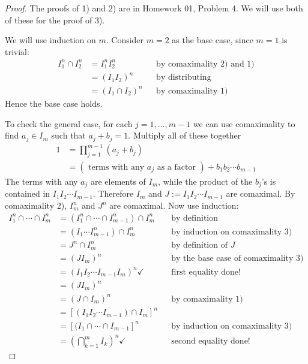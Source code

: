 \documentclass[12pt]{article}
\theoremstyle{definition}
\begin{document}
\begin{proof}
    The proofs of 1) and 2) are in Homework 01, Problem 4. We will use both of these for the proof of 3).
    
    We will use induction on $m$. Consider $m=2$ as the base case, since $m=1$ is trivial:
    \begin{align*}
        I_1^n\cap I_2^n&=I_1^nI_2^n&&\text{by comaximality 2) and 1)}\\
        &=(I_1I_2)^n&&\text{by distributing }\\
        &=(I_1\cap I_2)^n&&\text{by comaximality 1)}
    \end{align*}
    Hence the base case holds. \checkmark
    
    To check the general case, for each $j=1,\dotsc,m-1$ we can use comaximality to find $a_j\in I_m$ such that $a_j+b_j=1$. Multiply all of these together
    \begin{equation*}
        \begin{split}
            1&=\prod\limits_{j=1}^{m-1}(a_j+b_j)\\
            &=(\text{ terms with any $a_j$ as a factor })+b_1b_2\dotsm b_{m-1}
        \end{split}
    \end{equation*}
    The terms with any $a_j$ are elements of $I_m$, while the product of the $b_j$'s is contained in $I_1I_2\dotsm I_{m-1}$. Therefore $I_m$ and $J:=I_1I_2\dotsm I_{m-1}$ are comaximal. By comaximality 2), $I_m^n$ and $J^n$ are comaximal. Now use induction:
    \begin{align*}
        I_1^n\cap\dotsb\cap I_m^n&=(I_1^n\cap\dotsb\cap I_{m-1}^n)\cap I_m^n&&\text{by definition}\\
            &=(I_1\dotsm I_{m-1}^n)\cap I_m^n&&\text{by induction on comaximality 3)}\\
            &=J^n\cap I_m^n&&\text{by definition of }J\\
            &=(JI_m)^n&&\text{by the base case of comaximality 3)}\\
            &=(I_1I_2\dotsm I_{m-1}I_m)^n\checkmark&&\text{first equality done!}\\
            &=(JI_m)^n\\
            &=(J\cap I_m)^n&&\text{by comaximality 1)}\\
            &=[(I_1I_2\dotsm I_{m-1})\cap I_m]^n\\
            &=[(I_1\cap\dotsb\cap I_{m-1}]^n&&\text{by induction on comaximality 3)}\\
            &=\left(\bigcap\limits_{k=1}^mI_k\right)^n\checkmark&&\text{second equality done!}
    \end{align*}
\end{proof}
\end{document}
